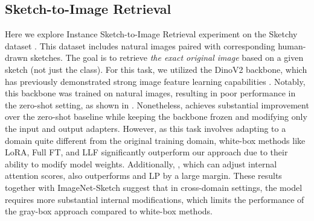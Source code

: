 \subsection{Sketch-to-Image Retrieval}

Here we explore Instance Sketch-to-Image Retrieval experiment on the Sketchy dataset \citep{SketchyDatabase}. This dataset includes natural images paired with corresponding human-drawn sketches. The goal is to retrieve {\it the exact original image} based on a given sketch (not just the class). For this task, we utilized the DinoV2 backbone, which has previously demonstrated strong image feature learning capabilities \citep{DinoV2}. Notably, this backbone was trained on natural images, resulting in poor performance in the zero-shot setting, as shown in . Nonetheless, \ours achieves substantial improvement over the zero-shot baseline while keeping the backbone frozen and modifying only the input and output adapters. However, as this task involves adapting to a domain quite different from the original training domain, white-box methods like LoRA, Full FT, and LLF significantly outperform our approach due to their ability to modify model weights. Additionally, \oursp, which can adjust internal attention scores, also outperforms \ours and LP by a large margin.
These results together with ImageNet-Sketch suggest that in cross-domain settings, the model requires more substantial internal modifications, which limits the performance of the gray-box approach compared to white-box methods.


